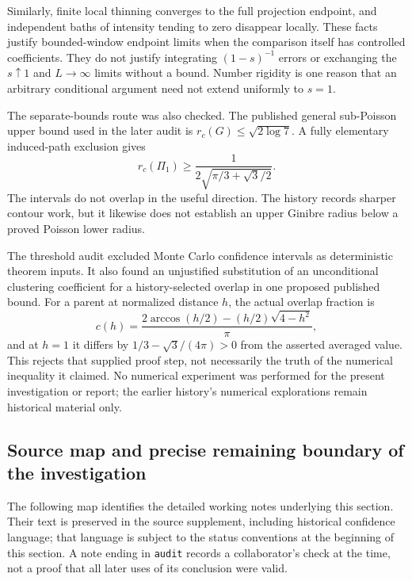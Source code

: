\documentclass[11pt,a4paper]{article}
\theoremstyle{definition}
\theoremstyle{remark}
\numberwithin{equation}{section}
\begin{document}
Similarly, finite local thinning converges to the full projection
endpoint, and independent baths of intensity tending to zero disappear
locally.  These facts justify bounded-window endpoint limits when the
comparison itself has controlled coefficients.  They do not justify
integrating $(1-s)^{-1}$ errors or exchanging the $s\uparrow1$ and
$L\to\infty$ limits without a bound.  Number rigidity is one reason
that an arbitrary conditional argument need not extend uniformly to
$s=1$.

The separate-bounds route was also checked.  The published general
sub-Poisson upper bound used in the later audit is
$r_c(G)\leq\sqrt{2\log7}$.  A fully elementary induced-path exclusion
gives
\[
 r_c(\Pi_1)\geq
 \frac{1}{2\sqrt{\pi/3+\sqrt3/2}}.
\]
The intervals do not overlap in the useful direction.  The history
records sharper contour work, but it likewise does not establish an
upper Ginibre radius below a proved Poisson lower radius.

The threshold audit excluded Monte Carlo confidence intervals as
deterministic theorem inputs.  It also found an unjustified substitution
of an unconditional clustering coefficient for a history-selected
overlap in one proposed published bound.  For a parent at normalized
distance $h$, the actual overlap fraction is
\[
 c(h)=\frac{2\arccos(h/2)-(h/2)\sqrt{4-h^2}}{\pi},
\]
and at $h=1$ it differs by
$1/3-\sqrt3/(4\pi)>0$ from the asserted averaged value.
This rejects that supplied proof step, not necessarily the truth of
the numerical inequality it claimed.  No numerical experiment was
performed for the present investigation or report; the earlier
history's numerical explorations remain historical material only.

\subsection{Source map and precise remaining boundary of the investigation}
\label{br:sourcemap}

The following map identifies the detailed working notes underlying this
section.  Their text is preserved in the source supplement, including
historical confidence language; that language is subject to the status
conventions at the beginning of this section.  A note ending in
\texttt{audit} records a collaborator's check at the time, not a proof
that all later uses of its conclusion were valid.
\end{document}

